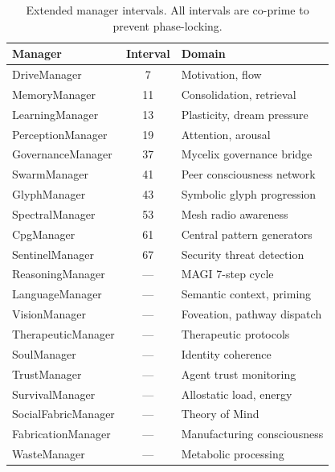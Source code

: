 \documentclass[12pt]{book}
\begin{document}
\begin{table}[H]
\centering
\caption{Extended manager intervals. All intervals are co-prime to prevent phase-locking.}
\label{tab:extended-managers}
\small
\begin{tabular}{lcl}
\toprule
\textbf{Manager} & \textbf{Interval} & \textbf{Domain} \\
\midrule
DriveManager       & 7  & Motivation, flow \\
MemoryManager      & 11 & Consolidation, retrieval \\
LearningManager    & 13 & Plasticity, dream pressure \\
PerceptionManager  & 19 & Attention, arousal \\
GovernanceManager  & 37 & Mycelix governance bridge \\
SwarmManager       & 41 & Peer consciousness network \\
GlyphManager       & 43 & Symbolic glyph progression \\
SpectralManager    & 53 & Mesh radio awareness \\
CpgManager         & 61 & Central pattern generators \\
SentinelManager    & 67 & Security threat detection \\
\addlinespace
ReasoningManager   & --- & MAGI 7-step cycle \\
LanguageManager    & --- & Semantic context, priming \\
VisionManager      & --- & Foveation, pathway dispatch \\
TherapeuticManager & --- & Therapeutic protocols \\
SoulManager        & --- & Identity coherence \\
TrustManager       & --- & Agent trust monitoring \\
SurvivalManager    & --- & Allostatic load, energy \\
SocialFabricManager & --- & Theory of Mind \\
FabricationManager & --- & Manufacturing consciousness \\
WasteManager       & --- & Metabolic processing \\
\bottomrule
\end{tabular}
\end{table}
\end{document}
